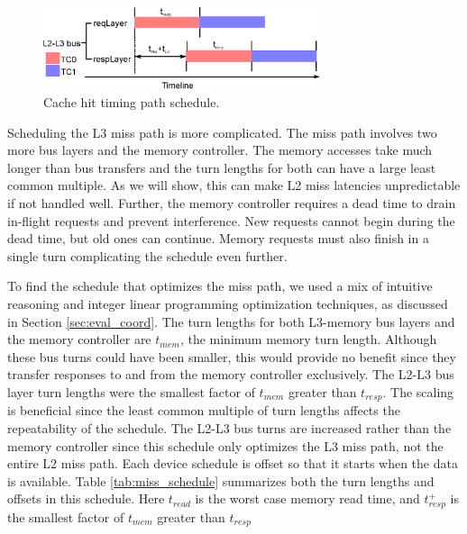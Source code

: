 \begin{figure}
    \begin{center}
        \includegraphics[width=3.2in]{figs/hit_schedule.eps}
        \caption{Cache hit timing path schedule.}
        \label{fig:hit_schedule}
    \end{center}
\end{figure}

Scheduling the L3 miss path is more complicated. The miss path involves two 
more bus layers and the memory controller. The memory accesses take much longer 
than bus transfers and the turn lengths for both can have a large least common 
multiple. As we will show, this can make L2 miss latencies unpredictable if not 
handled well. Further, the memory controller requires a dead time to drain 
in-flight requests and prevent interference. New requests cannot begin during 
the dead time, but old ones can continue. Memory requests must also finish in a 
single turn complicating the schedule even further.

To find the schedule that optimizes the miss path, we used a mix of intuitive
reasoning and integer linear programming optimization techniques, as discussed 
in Section \ref{sec:eval_coord}.
The turn lengths for both L3-memory bus layers and the memory controller are 
$t_{mem}$, the minimum memory turn length. Although these bus turns could have 
been smaller, this would provide no benefit since they transfer responses to 
and from the memory controller exclusively. The L2-L3 bus layer turn lengths 
were the smallest factor of $t_{mem}$ greater than $t_{resp}$. The scaling is 
beneficial since the least common multiple of turn lengths affects the
repeatability of the schedule. The L2-L3 bus turns are increased rather than 
the memory controller since this schedule only optimizes the L3 miss path, not 
the entire L2 miss path. Each device schedule is offset so that it starts when 
the data is available. Table \ref{tab:miss_schedule} summarizes both the turn
lengths and offsets in this schedule. Here $t_{read}$ is the worst case memory
read time, and $t_{resp}^+$ is the smallest factor of $t_{mem}$ greater than 
$t_{resp}$


